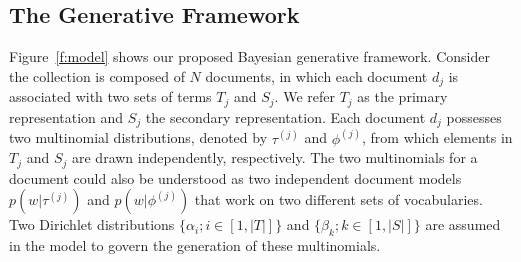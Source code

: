\subsection{The Generative Framework}

Figure~\ref{f:model} shows our proposed Bayesian generative framework.
Consider the collection is composed of $N$ documents, in which each document
$d_j$ is associated with two sets of terms $T_j$ and $S_j$.  We refer $T_j$ as
the primary representation and $S_j$ the secondary representation.  Each
document $d_j$ possesses two multinomial distributions, denoted by $\tau^{(j)}$
and $\phi^{(j)}$, from which elements in $T_j$ and $S_j$ are drawn
independently, respectively.  The two multinomials for a document could also be
understood as two independent document models $p(w|\tau^{(j)})$ and
$p(w|\phi^{(j)})$ that work on two different sets of vocabularies.  Two
Dirichlet distributions $\{\alpha_i; i \in [1, |T|]\}$ and $\{\beta_k; k \in
[1, |S|]\}$ are assumed in the model to govern the generation of these
multinomials.  

